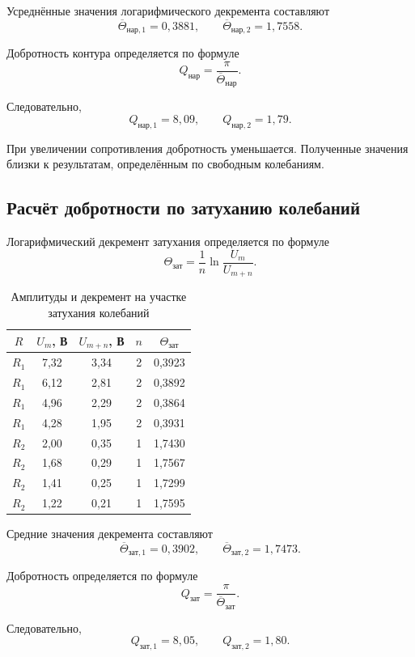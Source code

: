 \documentclass[a4paper,14pt]{extarticle}
\begin{document}
Усреднённые значения логарифмического
декремента составляют
\[
    \overline{\Theta}_{\text{нар},1}=0{,}3881,
    \qquad
    \overline{\Theta}_{\text{нар},2}=1{,}7558.
\]

Добротность контура определяется по формуле
\[
    Q_{\text{нар}}=\frac{\pi}{\overline{\Theta}_{\text{нар}}}.
\]

Следовательно,
\[
    Q_{\text{нар},1}=8{,}09,
    \qquad
    Q_{\text{нар},2}=1{,}79.
\]

При увеличении сопротивления добротность
уменьшается. Полученные значения близки
к результатам, определённым по свободным
колебаниям.

\newpage

\subsection{Расчёт добротности по затуханию колебаний}
Логарифмический декремент затухания определяется
по формуле
\[
    \Theta_{\text{зат}} =
    \frac{1}{n}\ln\frac{U_m}{U_{m+n}}.
\]

\begin{table}[H]
\centering
\small
\caption{Амплитуды и декремент на участке затухания колебаний}
\begin{tabular}{ccccc}
\toprule
$R$ & $U_m$, В & $U_{m+n}$, В &
$n$ & $\Theta_{\text{зат}}$ \\
\midrule
$R_1$ & 7,32 & 3,34 & 2 & 0,3923 \\
$R_1$ & 6,12 & 2,81 & 2 & 0,3892 \\
$R_1$ & 4,96 & 2,29 & 2 & 0,3864 \\
$R_1$ & 4,28 & 1,95 & 2 & 0,3931 \\
$R_2$ & 2,00 & 0,35 & 1 & 1,7430 \\
$R_2$ & 1,68 & 0,29 & 1 & 1,7567 \\
$R_2$ & 1,41 & 0,25 & 1 & 1,7299 \\
$R_2$ & 1,22 & 0,21 & 1 & 1,7595 \\
\bottomrule
\end{tabular}
\end{table}

Средние значения декремента составляют
\[
    \overline{\Theta}_{\text{зат},1}=0{,}3902,
    \qquad
    \overline{\Theta}_{\text{зат},2}=1{,}7473.
\]

Добротность определяется по формуле
\[
    Q_{\text{зат}} =
    \frac{\pi}{\overline{\Theta}_{\text{зат}}}.
\]

Следовательно,
\[
    Q_{\text{зат},1}=8{,}05,
    \qquad
    Q_{\text{зат},2}=1{,}80.
\]
\end{document}
